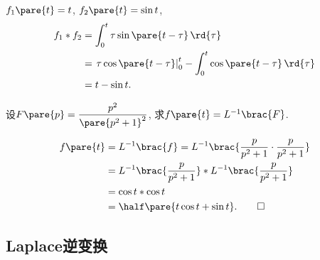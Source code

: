 \documentclass[../ComplexVariable.tex]{subfiles}
\begin{document}
\begin{sample}
    \begin{ex}
        $f_1\pare{t} = t$, $f_2\pare{t} = \sin t$,
        \begin{align*}
            f_1*f_2 &= \int_0^t \tau \sin \pare{t-\tau}\,\rd{\tau} \\
            &= \left.\tau\cos\pare{t-\tau}\right\vert_0^t - \int_0^t \cos\pare{t-\tau}\,\rd{\tau} \\
            &= t-\sin t.
        \end{align*}
    \end{ex}
\end{sample}
\begin{sample}
    \begin{ex}
        设$\displaystyle F\pare{p} = \frac{p^2}{\pare{p^2+1}^2}$, 求$f\pare{t} = L^{-1}\brac{F}$.
    \end{ex}
    \begin{solution}
        \begin{align*}
            f\pare{t} &= L^{-1}\brac{f} = L^{-1}\brac{\frac{p}{p^2+1}\cdot \frac{p}{p^2+1}} \\
            &= L^{-1}\brac{\frac{p}{p^2+1}} * L^{-1}\brac{\frac{p}{p^2+1}} \\
            &= \cos t * \cos t \\
            &= \half \pare{t\cos t + \sin t}. \qedhere
        \end{align*}
    \end{solution}
\end{sample}


\subsection{Laplace逆变换} %
\label{sub:laplace逆变换}
\end{document}
